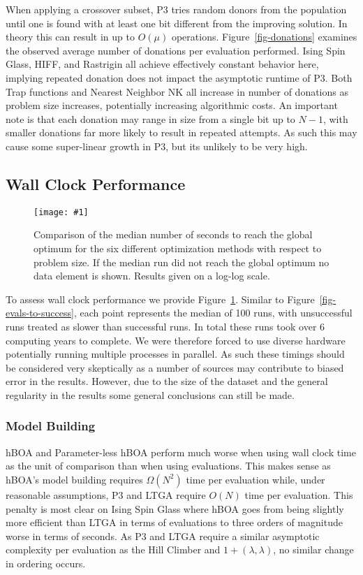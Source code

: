 \documentclass[twoside]{article}
\newcommand{\includegraphicsfit}[1]
{\texttt{[image: \#1]}}
\begin{document}
When applying a crossover subset, P3 tries random donors from the population until one is found with at least
one bit different from the improving solution. In theory this can result in up to $O(\mu)$ operations.
Figure~\ref{fig-donations} examines the observed average number of donations per evaluation performed.
Ising Spin Glass, HIFF, and Rastrigin all achieve effectively constant behavior here, implying repeated
donation does not impact the asymptotic runtime of P3. Both Trap functions and Nearest Neighbor NK all
increase in number of donations as problem size increases, potentially increasing algorithmic costs. An
important note is that each donation may range in size from a single bit up to $N-1$, with smaller
donations far more likely to result in repeated attempts. As such this may cause some super-linear growth
in P3, but its unlikely to be very high.

\subsection{Wall Clock Performance}
\begin{figure}
  \begin{center}
  \includegraphicsfit{seconds-to-success}
  \end{center}
  \caption{Comparison of the median number of seconds to reach the global optimum for
           the six different optimization methods with respect
           to problem size.  If the median run did not reach the global optimum no data element
           is shown.  Results given on a log-log scale.}
  \label{fig-seconds-to-success}
\end{figure}


To assess wall clock performance we provide Figure~\ref{fig-seconds-to-success}.
Similar to Figure~\ref{fig-evals-to-success}, each point represents the median
of 100 runs, with unsuccessful runs treated as slower than successful runs.
In total these runs
took over 6 computing years to complete. We were therefore forced to use
diverse hardware potentially running multiple processes in parallel.
As such these timings should be considered very skeptically as a number
of sources may contribute to biased error in the results. However, due to
the size of the dataset and the general regularity in the results some general conclusions
can still be made.

\subsubsection{Model Building}
hBOA and Parameter-less hBOA perform much worse when using wall clock time as the unit of comparison than when using
evaluations. This makes sense as hBOA's model building requires $\Omega(N^2)$ time per evaluation while, under reasonable
assumptions, P3 and LTGA require $O(N)$ time per evaluation. This penalty is most clear on Ising Spin Glass where
hBOA goes from being slightly more efficient than LTGA in terms of evaluations to three orders of magnitude worse in terms of seconds.
As P3 and LTGA require a similar asymptotic complexity per
evaluation as the Hill Climber and $1+(\lambda, \lambda)$, no similar change in ordering occurs.
\end{document}

